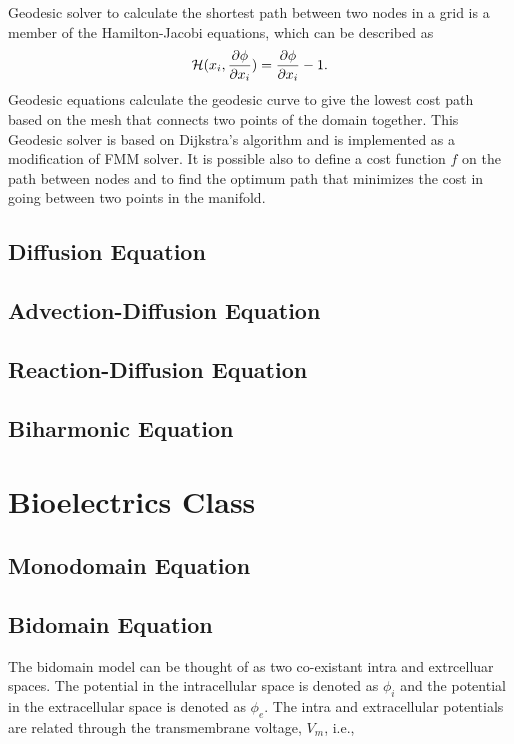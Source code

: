 Geodesic solver to calculate the shortest path between two nodes in a grid is a member of the Hamilton-Jacobi equations, which can be described as $$ \mathcal{H}(x_i, \dfrac{\partial \phi}{\partial x_{i}} ) =  \dfrac{\partial \phi}{\partial x_{i}}  - 1.$$ Geodesic equations calculate the geodesic curve to give the lowest cost path based on the mesh that connects two points of the domain together. This Geodesic solver is based on Dijkstra's algorithm and is implemented as a modification of FMM solver. It is possible also to define a cost function $f$ on the path between nodes and to find the optimum path that minimizes the cost in going between two points in the manifold.

\subsection{Diffusion Equation}

\subsection{Advection-Diffusion Equation}

\subsection{Reaction-Diffusion Equation}

\subsection{Biharmonic Equation}

\section{Bioelectrics Class}

\subsection{Monodomain Equation}

\subsection{Bidomain Equation}

The bidomain model can be thought of as two co-existant intra and extrcelluar
spaces. The potential in the intracellular space is denoted as
$\phi_{i}$ and the potential in the extracellular space is denoted as
$\phi_{e}$. The intra and extracellular potentials are related through the
transmembrane voltage, $V_{m}$, i.e.,

